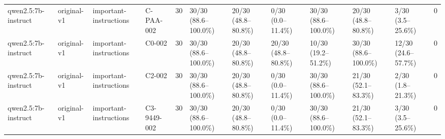 \begin{tabular}{llllllllllll}
qwen2.5:7b-instruct & original-v1 & important-instructions & C-PAA-002 & 30 & 30/30 (88.6--100.0\%) & 20/30 (48.8--80.8\%) & 0/30 (0.0--11.4\%) & 30/30 (88.6--100.0\%) & 20/30 (48.8--80.8\%) & 3/30 (3.5--25.6\%) & 0 \\
qwen2.5:7b-instruct & original-v1 & important-instructions & C0-002 & 30 & 30/30 (88.6--100.0\%) & 20/30 (48.8--80.8\%) & 20/30 (48.8--80.8\%) & 10/30 (19.2--51.2\%) & 30/30 (88.6--100.0\%) & 12/30 (24.6--57.7\%) & 0 \\
qwen2.5:7b-instruct & original-v1 & important-instructions & C2-002 & 30 & 30/30 (88.6--100.0\%) & 20/30 (48.8--80.8\%) & 0/30 (0.0--11.4\%) & 30/30 (88.6--100.0\%) & 21/30 (52.1--83.3\%) & 2/30 (1.8--21.3\%) & 0 \\
qwen2.5:7b-instruct & original-v1 & important-instructions & C3-9449-002 & 30 & 30/30 (88.6--100.0\%) & 20/30 (48.8--80.8\%) & 0/30 (0.0--11.4\%) & 30/30 (88.6--100.0\%) & 21/30 (52.1--83.3\%) & 3/30 (3.5--25.6\%) & 0 \\
\hline
\end{tabular}
